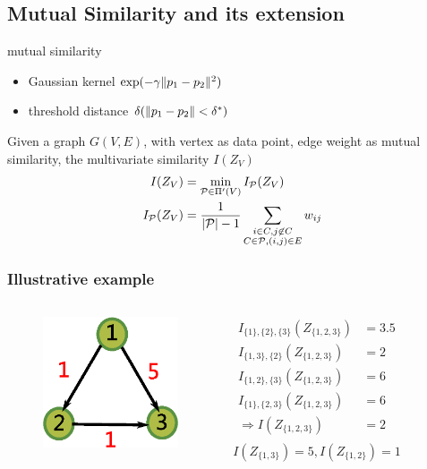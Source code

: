 \documentclass[notheorems]{beamer}
\begin{document}
\subsection{Mutual Similarity and its extension}
\begin{frame}
\begin{block}{mutual similarity}
\begin{itemize}
\item Gaussian kernel $ \exp({-\gamma \lVert p_1 - p_2\rVert^2})$
\item threshold distance $\delta(\lVert p_1-p_2\rVert < \delta^*)$
\end{itemize}
\end{block}

\begin{definition}
Given a graph $G(V, E)$, with vertex as data point, edge weight as mutual similarity, the multivariate similarity $I(Z_V)$
\begin{align}
I(Z_V) & = \min_{\mathcal{P} \in \Pi'(V)} I_{\mathcal{P}}(Z_V) \\
\label{eq:newDef}  I_{\mathcal{P}}(Z_V) & = \frac{1}{ \lvert\mathcal{P}\rvert - 1} \sum_{\substack{i\in C, j \not\in C\\ C\in \mathcal{P}, (i,j) \in E}} w_{ij}
\end{align}
\end{definition}
\end{frame}
\begin{frame}
\frametitle{Illustrative example}
\begin{columns}
\column{5cm}
\begin{figure}
\includegraphics[width=4cm]{pic/example_directed.eps}
\end{figure}
\column{5cm}
\begin{align*}
I_{\{1\},\{2\},\{3\}}(Z_{\{1,2,3\}}) & = 3.5 \\
I_{\{1,3\},\{2\}}(Z_{\{1,2,3\}}) & = 2 \\ 
I_{\{1,2\},\{3\}}(Z_{\{1,2,3\}}) & = 6 \\ 
I_{\{1\},\{2,3\}}(Z_{\{1,2,3\}}) & = 6 \\ 
\Rightarrow I(Z_{\{1,2,3\}}) & = 2 \\
\end{align*}
\begin{equation*}
I(Z_{\{1,3\}}) = 5, I(Z_{\{1,2\}}) = 1
\end{equation*}
\end{columns}
\end{frame}
\end{document}

